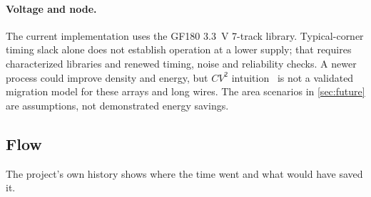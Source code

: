 \paragraph{Voltage and node.}
The current implementation uses the GF180 \SI{3.3}{V} 7-track library. Typical-corner timing slack alone does not establish operation at a lower supply; that requires characterized libraries and renewed timing, noise and reliability checks. A newer process could improve density and energy, but $CV^2$ intuition~\cite{horowitz2014energy} is not a validated migration model for these arrays and long wires. The area scenarios in \cref{sec:future} are assumptions, not demonstrated energy savings.

\subsection{Flow}
The project's own history shows where the time went and what would have saved it.

